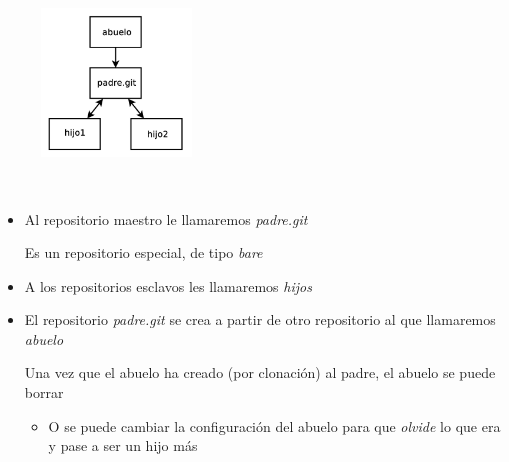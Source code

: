 \documentclass[ucs]{beamer}
\begin{document}
\begin{frame}[fragile]
\frametitle{}
\begin{minipage}{1.5cm}
\begin{figure}
\includegraphics[width=4.0cm]{figs/familia_repos}
\end{figure}
\end{minipage} \hfill
\
\begin{minipage}{7.2cm}
\begin{itemize} 

\item
Al repositorio maestro le llamaremos \emph{padre.git} 

Es un repositorio especial, de tipo \emph{bare}
\item
A los repositorios esclavos les llamaremos \emph{hijos}
\item
El repositorio \emph{padre.git} se crea a partir de otro repositorio
al que llamaremos \emph{abuelo}

Una vez que el abuelo ha creado (por clonación) al padre, el
abuelo se puede borrar
\begin{itemize}
\item
O se puede cambiar la configuración del abuelo para que \emph{olvide}
lo que era 
y pase a ser un hijo más
\end{itemize}



\end{itemize}
\end{minipage}\hfill
\end{frame}

\end{document}
